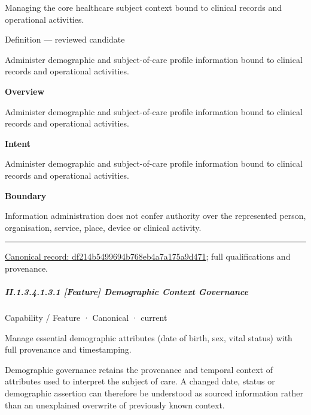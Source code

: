 Managing the core healthcare subject context bound to clinical records and operational activities.



Definition — reviewed candidate



Administer demographic and subject-of-care profile information bound to clinical records and operational activities.



\textbf{Overview}



Administer demographic and subject-of-care profile information bound to clinical records and operational activities.



\textbf{Intent}



Administer demographic and subject-of-care profile information bound to clinical records and operational activities.



\textbf{Boundary}



Information administration does not confer authority over the represented person, organisation, service, place, device or clinical activity.



\medskip\hrule\medskip

{\footnotesize \href{../../../../../../../continuum/strategy/capability/df214b5499694b768eb4a7a175a9d471.md}{Canonical record: df214b5499694b768eb4a7a175a9d471}; full qualifications and provenance.}\par
\subparagraph*{II.1.3.4.1.3.1 [Feature] Demographic Context Governance}
\label{navigation:II.1.3.4.1.3.1}

\label{element:3d0377451a1b44d0bb41404207cdd867}
{\small Capability / Feature · Canonical · current}\par

Manage essential demographic attributes (date of birth, sex, vital status) with full provenance and timestamping.



Demographic governance retains the provenance and temporal context of attributes used to interpret the subject of care. A changed date, status or demographic assertion can therefore be understood as sourced information rather than an unexplained overwrite of previously known context.


